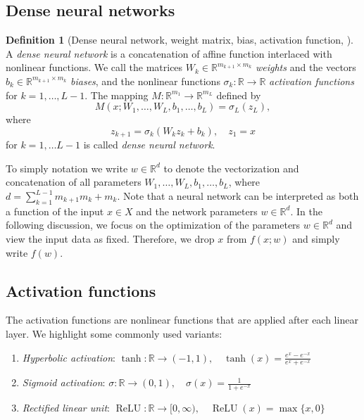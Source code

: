 \documentclass[12pt]{article}
\theoremstyle{definition}
\newtheorem{definition}[definition]{Definition}
\numberwithin{equation}{section}
\newcommand{\R}{\mathbb{R}}
\DeclareMathOperator{\ReLU}{ReLU}
\begin{document}
\subsection{Dense neural networks}
\begin{definition}[Dense neural network, weight matrix, bias, activation function, ]
  A \emph{dense neural network} is a concatenation of affine function interlaced with nonlinear functions. We call the matrices $W_k \in \R^{m_{k+1} \times m_k}$ \emph{weights} and the vectors $b_k \in \R^{m_{k+1} \times m_k}$ \emph{biases}, and the nonlinear functions $\sigma_k : \R \rightarrow \R$ \emph{activation functions} for $k = 1, \dots, L-1$. The mapping $M : \R^{m_1} \rightarrow \R^{m_L}$ defined by
  \begin{equation*}
      M(x;W_1,\dots,W_L,b_1,\dots,b_L) = \sigma_L(z_L),
  \end{equation*}
  where 
  \begin{equation*}
    z_{k+1} = \sigma_k(W_k z_k + b_k), \quad z_1 = x
  \end{equation*}
  for $k = 1, \dots L-1$ is called \emph{dense neural network}.
\end{definition}
To simply notation we write $w \in \R^d$ to denote the vectorization and concatenation of all parameters $W_1, \dots, W_L, b_1, \dots, b_L$, where $d = \sum_{k=1}^{L-1} m_{k+1}m_k + m_k$.
Note that a neural network can be interpreted as both a function of the input $x \in X$ and the network parameters $w \in \R^d$. In the following discussion, we focus on the optimization of the parameters $w \in \R^d$ and view the input data as fixed. Therefore, we drop $x$ from $f(x;w)$ and simply write $f(w)$.
\subsection{Activation functions}
The activation functions are nonlinear functions that are applied after each linear layer. We highlight some commonly used variants:
\begin{enumerate}
  \item \emph{Hyperbolic activation}: $\tanh : \R \rightarrow (-1,1), \quad \tanh(x) = \frac{e^x - e^{-x}}{e^x + e^{-x}}$
  \item \emph{Sigmoid activation}: $\sigma : \R \rightarrow (0,1), \quad \sigma(x) = \frac{1}{1+e^{-x}}$
  \item \emph{Rectified linear unit}: $\ReLU : \R \rightarrow [0,\infty), \quad \ReLU(x) = \max\{x,0\}$
\end{enumerate}
\end{document}
